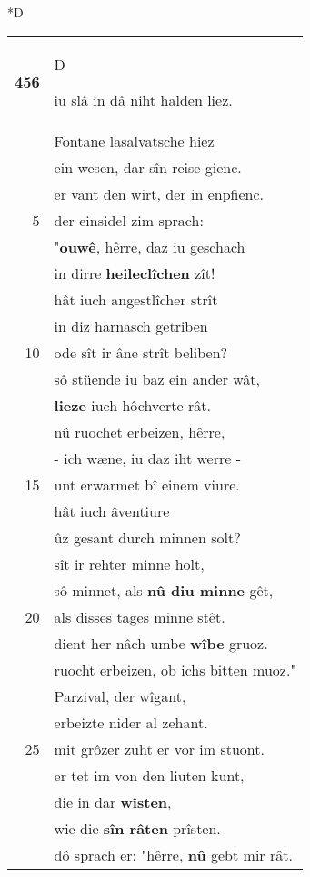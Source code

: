 \documentclass[8pt,a4paper,notitlepage]{article}
\begin{document}
\begin{table}[ht]
\begin{minipage}[t]{0.5\linewidth}
\small
\begin{center}*D
\end{center}
\begin{tabular}{rl}
\textbf{456} & \begin{large}D\end{large}iu slâ in dâ niht halden liez.\\ 
 & Fontane lasalvatsche hiez\\ 
 & ein wesen, dar sîn reise gienc.\\ 
 & er vant den wirt, der in enpfienc.\\ 
5 & der einsidel zim sprach:\\ 
 & "\textbf{ouwê}, hêrre, daz iu geschach\\ 
 & in dirre \textbf{heileclîchen} zît!\\ 
 & hât iuch angestlîcher strît\\ 
 & in diz harnasch getriben\\ 
10 & ode sît ir âne strît beliben?\\ 
 & sô stüende iu baz ein ander wât,\\ 
 & \textbf{lieze} iuch hôchverte rât.\\ 
 & nû ruochet erbeizen, hêrre,\\ 
 & - ich wæne, iu daz iht werre -\\ 
15 & unt erwarmet bî einem viure.\\ 
 & hât iuch âventiure\\ 
 & ûz gesant durch minnen solt?\\ 
 & sît ir rehter minne holt,\\ 
 & sô minnet, als \textbf{nû diu minne} gêt,\\ 
20 & als disses tages minne stêt.\\ 
 & dient her nâch umbe \textbf{wîbe} gruoz.\\ 
 & ruocht erbeizen, ob ichs bitten muoz."\\ 
 & Parzival, der wîgant,\\ 
 & erbeizte nider al zehant.\\ 
25 & mit grôzer zuht er vor im stuont.\\ 
 & er tet im von den liuten kunt,\\ 
 & die in dar \textbf{wîsten},\\ 
 & wie die \textbf{sîn râten} prîsten.\\ 
 & dô sprach er: "hêrre, \textbf{nû} gebt mir rât.\\ 

\end{tabular}
\end{minipage}
\end{table}
\end{document}
